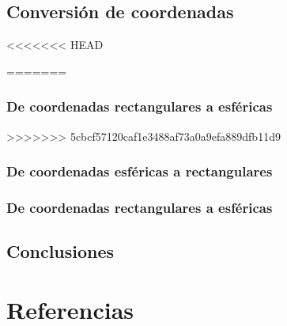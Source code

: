 \documentclass[letterpaper,14pt]{extreport} %
\begin{document}
    \section{Conversión de coordenadas}
<<<<<<< HEAD
      
=======
      \subsection{De coordenadas rectangulares a esféricas}
          
>>>>>>> 5cbcf57120caf1e3488af73a0a9efa889dfb11d9

      \subsection{De coordenadas esféricas a rectangulares}
          

      \subsection{De coordenadas rectangulares a esféricas}
          

    \section{Conclusiones}
      

  \chapter{Referencias}
    
\end{document}
